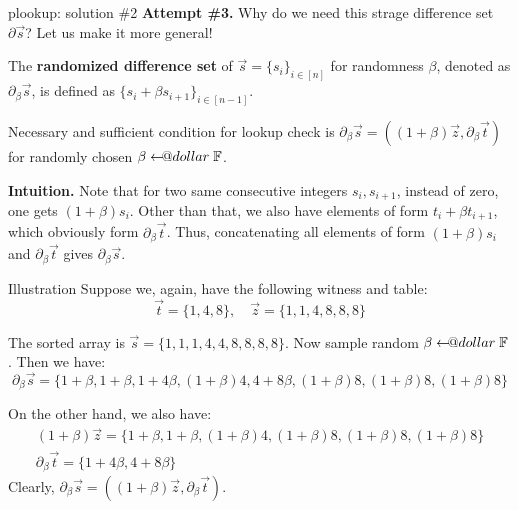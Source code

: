 \documentclass{zkdl-presentation-template}
\makeatletter
\newcommand\leftarrowS{\leftarrow\joinrel\smalldollar}
\newcommand{\smalldollar}{\mathrel{\mathpalette\small@dollar\relax}}
\newcommand{\small@dollar}[2]{%
  \vcenter{\hbox{%
    $#1\textnormal{\fontsize{0.7\dimexpr\f@size pt}{0}\selectfont\$}$%
  }}%
}
\makeatother
\begin{document}
    \begin{frame}{plookup: solution \#2}
        \textbf{Attempt \#3.} Why do we need this strage difference set $\partial\vec{s}$? Let us 
        make it more general!\pause
        \begin{definition}
            The \textbf{randomized difference set} of $\vec{s}=\{s_i\}_{i \in
            [n]}$ for randomness $\beta$, denoted as $\partial_{\beta}\vec{s}$,
            is defined as $\{s_i+\beta s_{i+1}\}_{i \in [n-1]}$.\pause
        \end{definition} 

        \begin{lemma}
            Necessary and sufficient condition for lookup check is
            $\partial_{\beta}\vec{s} = ((1+\beta)\vec{z},
            \partial_{\beta}\vec{t})$ for randomly chosen $\beta \leftarrowS
            \mathbb{F}$.\pause
        \end{lemma}

        \textbf{Intuition.} Note that for two same consecutive integers
        $s_i,s_{i+1}$, instead of zero, one gets $(1+\beta)s_i$. Other than
        that, we also have elements of form $t_i+\beta t_{i+1}$, which obviously
        form $\partial_{\beta}\vec{t}$. Thus, concatenating all elements of form
        $(1+\beta)s_i$ and $\partial_{\beta}\vec{t}$ gives
        $\partial_{\beta}\vec{s}$.
    \end{frame}

    \begin{frame}{Illustration}
        Suppose we, again, have the following witness and table:
        \begin{equation*}
            \vec{t} = \{1,4,8\}, \quad \vec{z} = \{1,1,4,8,8,8\}
        \end{equation*}

        \pause The sorted array is $\vec{s} = \{1,1,1,4,4,8,8,8,8\}$. Now sample 
        random $\beta \leftarrowS \mathbb{F}$. Then we have:
        \begin{equation*}
            \partial_{\beta}\vec{s} = \{1+\beta,1+\beta,1+4\beta,(1+\beta)4,4+8\beta,(1+\beta)8,(1+\beta)8,(1+\beta)8\}
        \end{equation*}

        \pause On the other hand, we also have:
        \begin{gather*}
            (1+\beta)\vec{z} = \{1+\beta,1+\beta,(1+\beta)4,(1+\beta)8,(1+\beta)8,(1+\beta)8\} \\
            \partial_{\beta}\vec{t} = \{1+4\beta, 4+8\beta\}
        \end{gather*}
        \pause Clearly,
        $\partial_{\beta}\vec{s}=((1+\beta)\vec{z},\partial_{\beta}\vec{t})$.
    \end{frame}
\end{document}
